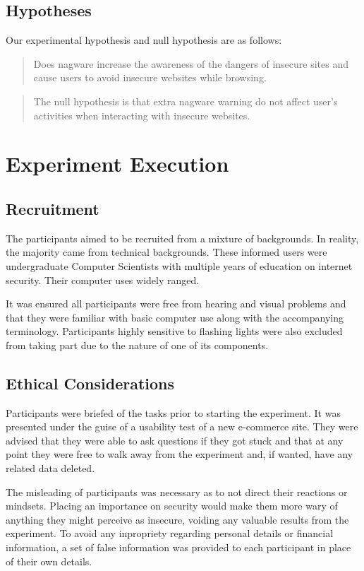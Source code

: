\documentclass{mpaper}
\begin{document}
\subsection{Hypotheses}
Our experimental hypothesis and null hypothesis are as follows:

\begin{quote}
Does nagware increase the awareness of the dangers of insecure sites and cause users to avoid insecure websites while browsing.
\end{quote}
\begin{quote}
The null hypothesis is that extra nagware warning do not affect user's activities when interacting with insecure websites.
\end{quote}
\section{Experiment Execution}
\subsection{Recruitment}
The participants aimed to be recruited from a mixture of backgrounds. In reality, the majority came from technical backgrounds. These informed users were undergraduate Computer Scientists with multiple years of education on internet security. Their computer uses widely ranged.

It was ensured all participants were free from hearing and visual problems and that they were familiar with basic computer use along with the accompanying terminology. Participants highly sensitive to flashing lights were also excluded from taking part due to the nature of one of its components.

\subsection{Ethical Considerations}
Participants were briefed of the tasks prior to starting the experiment. It was presented under the guise of a usability test of a new e-commerce site. They were advised that they were able to ask questions if they got stuck and that at any point they were free to walk away from the experiment and, if wanted, have any related data deleted.

The misleading of participants was necessary as to not direct their reactions or mindsets. Placing an importance on security would make them more wary of anything they might perceive as insecure, voiding any valuable results from the experiment. To avoid any inpropriety regarding personal details or financial information, a set of false information was provided to each participant in place of their own details.
\end{document}
